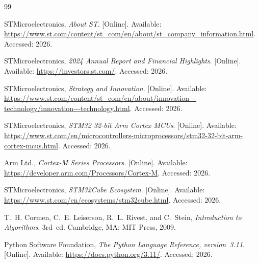 \documentclass[12pt,a4paper,oneside]{book}
\begin{document}











\appendix








\begin{thebibliography}{99}


STMicroelectronics, \emph{About ST}. [Online]. Available: \url{https://www.st.com/content/st_com/en/about/st_company_information.html}. Accessed: 2026.

STMicroelectronics, \emph{2024 Annual Report and Financial Highlights}. [Online]. Available: \url{https://investors.st.com/}. Accessed: 2026.

STMicroelectronics, \emph{Strategy and Innovation}. [Online]. Available: \url{https://www.st.com/content/st_com/en/about/innovation---technology/innovation---technology.html}. Accessed: 2026.

STMicroelectronics, \emph{STM32 32-bit Arm Cortex MCUs}. [Online]. Available: \url{https://www.st.com/en/microcontrollers-microprocessors/stm32-32-bit-arm-cortex-mcus.html}. Accessed: 2026.

Arm Ltd., \emph{Cortex-M Series Processors}. [Online]. Available: \url{https://developer.arm.com/Processors/Cortex-M}. Accessed: 2026.

STMicroelectronics, \emph{STM32Cube Ecosystem}. [Online]. Available: \url{https://www.st.com/en/ecosystems/stm32cube.html}. Accessed: 2026.

T.~H. Cormen, C.~E. Leiserson, R.~L. Rivest, and C.~Stein, \emph{Introduction to Algorithms}, 3rd~ed. Cambridge, MA: MIT Press, 2009.


Python Software Foundation, \emph{The Python Language Reference, version~3.11}. [Online]. Available: \url{https://docs.python.org/3.11/}. Accessed: 2026.


\end{thebibliography}
\end{document}
